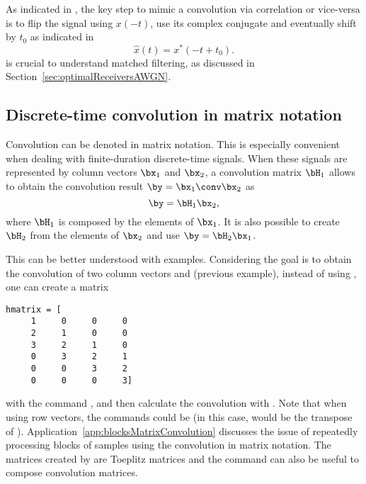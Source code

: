 
As indicated in , the key step to mimic a 
convolution via correlation or vice-versa is to flip the signal using $x(-t)$, use its 
complex conjugate and eventually shift by $t_0$ as  indicated in
\begin{equation}
\hat x(t) = x^*(-t + t_0).
\label{eq:convViaCorr}
\end{equation}
\ifml
\else
{} is crucial to understand matched filtering, as discussed in Section~\ref{sec:optimalReceiversAWGN}.
\fi

\subsection{{\akadvanced} Discrete-time convolution in matrix notation}
\label{sec:convolutionAsMatrix}

Convolution can be denoted in matrix notation. This is especially convenient when dealing with finite-duration discrete-time signals. When these signals are represented by column vectors $\bx_1$ and $\bx_2$, a convolution matrix $\bH_1$ allows to obtain the convolution result $\by = \bx_1 \conv \bx_2$ as
\begin{equation}
\by = \bH_1 \bx_2,
\label{eq:convolutionInMatrixNotation}
\end{equation}
where $\bH_1$ is composed by the elements of $\bx_1$. It is also possible to create $\bH_2$ from the elements of $\bx_2$ and use $\by = \bH_2 \bx_1$.

This can be better understood with examples. Considering the goal is to obtain the convolution of two column vectors  and  (previous example), instead of using , one can create a matrix 
\begin{verbatim}
hmatrix = [
     1     0     0     0
     2     1     0     0
     3     2     1     0
     0     3     2     1
     0     0     3     2
     0     0     0     3]
\end{verbatim}
with the command , and then calculate the convolution with . Note that when using row vectors, the commands could be  (in this case,  would be the transpose of ).
Application~\ref{app:blocksMatrixConvolution} discusses the issue of repeatedly processing blocks of samples using the convolution in matrix notation.
The matrices created by  are Toeplitz matrices and the command 
can also be useful to compose convolution matrices.


